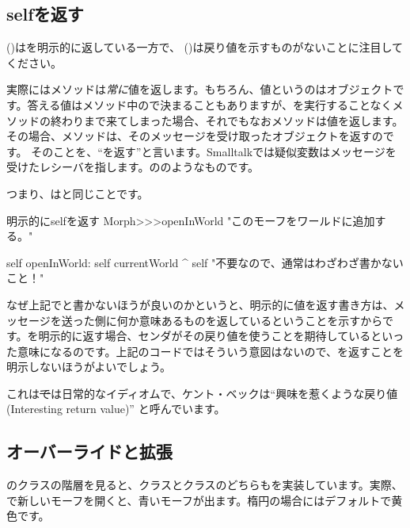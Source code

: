 \documentclass[a4paper,10pt,twoside]{book}
\begin{document}
\subsection{selfを返す} 

 ()はを明示的に返している一方で、 ()は戻り値を示すものがないことに注目してください。

実際にはメソッドは\emph{常に}値を返します。もちろん、値というのはオブジェクトです。答える値はメソッド中の\ct{^}で決まることもありますが、\ct{^}を実行することなくメソッドの終わりまで来てしまった場合、それでもなおメソッドは値を返します。その場合、メソッドは、そのメッセージを受け取ったオブジェクトを返すのです。
そのことを、``\self を返す''と言います。Smalltalkでは疑似変数\self はメッセージを受けたレシーバを指します。ののようなものです。

つまり、はと同じことです。

\begin{method}[openInWorldReturnSelf]{明示的にselfを返す}
Morph>>>openInWorld
	"このモーフをワールドに追加する。"
	
    self openInWorld: self currentWorld
	^ self		"不要なので、通常はわざわざ書かないこと！"
\end{method}

なぜ上記でと書かないほうが良いのかというと、明示的に値を返す書き方は、メッセージを送った側に何か意味あるものを返しているということを示すからです。\self を明示的に返す場合、センダがその戻り値を使うことを期待しているといった意味になるのです。上記のコードではそういう意図はないので、\self を返すことを明示しないほうがよいでしょう。

これは\st では日常的なイディオムで、ケント・ベックは``興味を惹くような戻り値(Interesting return value)'' \cite{Beck97a} と呼んでいます。


\subsection{オーバーライドと拡張}

のクラスの階層を見ると、クラスと\mbox{}クラスのどちらもを実装しています。実際、で新しいモーフを開くと、青いモーフが出ます。楕円の場合にはデフォルトで黄色です。
\end{document}
